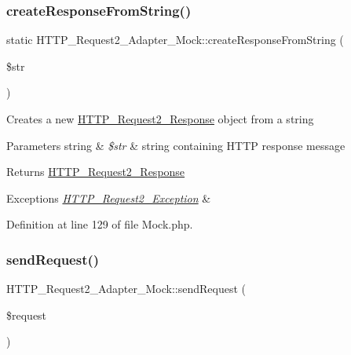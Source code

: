 \subsubsection{\texorpdfstring{create\+Response\+From\+String()}{createResponseFromString()}}
{\footnotesize\ttfamily static H\+T\+T\+P\+\_\+\+Request2\+\_\+\+Adapter\+\_\+\+Mock\+::create\+Response\+From\+String (\begin{DoxyParamCaption}\item[{}]{\$str }\end{DoxyParamCaption})\hspace{0.3cm}{\ttfamily [static]}}

Creates a new \hyperlink{classHTTP__Request2__Response}{H\+T\+T\+P\+\_\+\+Request2\+\_\+\+Response} object from a string


\begin{DoxyParams}[1]{Parameters}
string & {\em \$str} & string containing H\+T\+TP response message\\
\hline
\end{DoxyParams}
\begin{DoxyReturn}{Returns}
\hyperlink{classHTTP__Request2__Response}{H\+T\+T\+P\+\_\+\+Request2\+\_\+\+Response} 
\end{DoxyReturn}

\begin{DoxyExceptions}{Exceptions}
{\em \hyperlink{classHTTP__Request2__Exception}{H\+T\+T\+P\+\_\+\+Request2\+\_\+\+Exception}} & \\
\hline
\end{DoxyExceptions}


Definition at line 129 of file Mock.\+php.

\hypertarget{classHTTP__Request2__Adapter__Mock_ab85697c5438cc9b4c834ac6f15c46247}{}\label{classHTTP__Request2__Adapter__Mock_ab85697c5438cc9b4c834ac6f15c46247} 
\subsubsection{\texorpdfstring{send\+Request()}{sendRequest()}}
{\footnotesize\ttfamily H\+T\+T\+P\+\_\+\+Request2\+\_\+\+Adapter\+\_\+\+Mock\+::send\+Request (\begin{DoxyParamCaption}\item[{\hyperlink{classHTTP__Request2}{H\+T\+T\+P\+\_\+\+Request2}}]{\$request }\end{DoxyParamCaption})}

